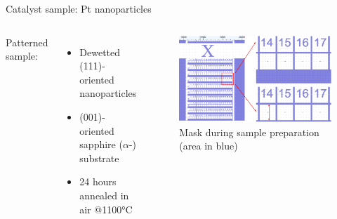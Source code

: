 \begin{frame}{Catalyst sample: Pt nanoparticles}
    \medskip
    \begin{columns}

    
            Patterned sample:
            \begin{itemize}
                \item Dewetted (111)-oriented nanoparticles
                \item (001)-oriented sapphire ($\alpha$-) substrate
                \item 24 hours annealed in air @1100°C
            \end{itemize}

            \vspace{0.5cm}
            \begin{figure}
                \centering
                \includegraphics[width=\textwidth]{Figures/sample/mask.png}
                \caption{Mask during sample preparation (area in blue)}
                \label{fig:mask}
            \end{figure}

        \pause


\end{columns}
\end{frame}
